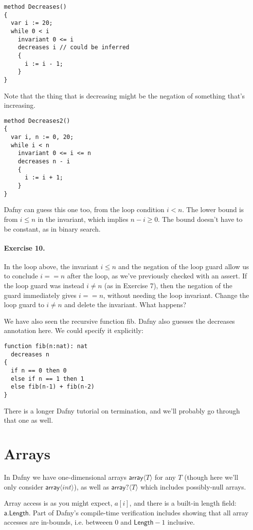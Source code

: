 \documentclass[11pt]{article}
\begin{document}
\begin{lstlisting}[language=dafny]
method Decreases()
{
  var i := 20;
  while 0 < i
    invariant 0 <= i
    decreases i // could be inferred
    {
      i := i - 1;
    }
}
\end{lstlisting}
Note that the thing that is decreasing might be the negation of something that's increasing.
\begin{lstlisting}[language=dafny]
method Decreases2()
{
  var i, n := 0, 20;
  while i < n
    invariant 0 <= i <= n
    decreases n - i
    {
      i := i + 1;
    }
}
\end{lstlisting}
Dafny can guess this one too, from the loop condition $i < n$.
The lower bound is from $i \leq n$ in the invariant, which implies
$n - i \geq 0$. The bound doesn't have to be constant, as in binary search.

\paragraph{Exercise 10.} In the loop above, the invariant $i \leq n$
and the negation of the loop guard allow us to conclude $i == n$ after the loop,
as we've previously checked with an \textsf{assert}. If the loop guard was instead
$i \neq n$ (as in Exercise 7), then the negation of the guard immediately gives $i == n$,
without needing the loop invariant. Change the loop guard to $i \neq n$ and delete the invariant.
What happens?

We have also seen the recursive function \textsf{fib}. Dafny also guesses the decreases
annotation here. We could specify it explicitly:

\begin{lstlisting}[language=dafny]
function fib(n:nat): nat
  decreases n
{
  if n == 0 then 0
  else if n == 1 then 1
  else fib(n-1) + fib(n-2)
}
\end{lstlisting}

There is a longer Dafny tutorial on termination, and we'll probably go through that one as well.

\section*{Arrays}
In Dafny we have one-dimensional arrays $\mathsf{array}\langle T \rangle$ for any $T$ (though here we'll only consider
$\mathsf{array}\langle int \rangle$), as well as $\mathsf{array}?\langle T \rangle$ which includes possibly-null arrays.

Array access is as you might expect, $a[i]$, and there is a built-in
length field: $\mathsf{a}.\mathsf{Length}$.  Part of Dafny's
compile-time verification includes showing that all array accesses are
in-bounds, i.e.  betweeen 0 and $\textsf{Length}-1$ inclusive.
\end{document}
